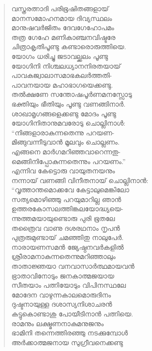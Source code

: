 \begin{verse}
വസ്ത്രരത്നാദി പരിഭൂഷിതങ്ങളായ്\\
മാനസമോഹനമായ ദിവ്യസ്ഥലം\\
മാനുഷവര്‍ജിതം ദേവഗേഹോപമം\\
തത്ര ഗേഹേ മണികാഞ്ചനവിഷ്ടരേ\\
ചിത്രാകൃതിപൂണ്ടു കണ്ടാരൊരുത്തിയെ.\\
യോഗം ധരിച്ചു ജടാവല്ക്കലം പൂണ്ടു\\
യോഗിനി നിശ്ചലധ്യാനനിരതയായ്\\
പാവകജ്വാലാസമാഭകലര്‍ത്തതി-\\
പാവനയായ മഹാഭാഗയെക്കണ്ടു.\\
തല്‍ക്ഷണേ സന്തോഷപൂര്‍ണമനസ്സോടു\\
ഭക്തിയും ഭീതിയും പൂണ്ടു വണങ്ങിനാര്‍.\\
ശാഖാമൃഗങ്ങളെക്കണ്ടു മോദം പൂണ്ടു\\
യോഗിനിതാനുമവരോടു ചൊല്ലിനാള്‍:\\
“നിങ്ങളാരാകുന്നതെന്നു പറയണ-\\
മിങ്ങുവന്നീടുവാന്‍ മൂലവും ചൊല്ലണം.\\
എങ്ങനെ മാര്‍ഗമറിഞ്ഞവാറെന്നതു-\\
മെങ്ങിനിപ്പോകുന്നതെന്നും പറയണം.”\\
എന്നിവ കേട്ടൊരു വായുതനയനും\\
നന്നായ് വണങ്ങി വിനീതനായ് ചൊല്ലിനാന്‍:\\
“വൃത്താന്തമൊക്കവേ കേട്ടാലുമെങ്കിലോ\\
സത്യമൊഴിഞ്ഞു പറയുമാറില്ല ഞാന്‍\\
ഉത്തരകോസലത്തിങ്കലയോദ്ധ്യയെ-\\
ന്നുത്തമയായുണ്ടൊരു പുരി ഭൂതലേ\\
തത്രൈവ വാണു ദശരഥനാം നൃപന്‍\\
പുത്രരുമുണ്ടായ് ചമഞ്ഞിതു നാലുപേര്‍.\\
നാരായണസമന്‍ ജ്യേഷ്ഠനവര്‍കളില്‍\\
ശ്രീരാമനാകുന്നതെന്നുമറിഞ്ഞാലും\\
താതാജ്ഞയാ വനവാസാര്‍ത്ഥമായവന്‍\\
ഭ്രാതാവിനോടും ജനകാത്മജയായ\\
സീതയാം പത്നിയോടും വിപിനസ്ഥലേ\\
മോദേന വാഴുന്നകാലമൊരുദിനം\\
ദുഷ്ടനായുള്ള ദശാസ്യനിശാചരന്‍\\
കട്ടുകൊണ്ടാശു പോയീടിനാന്‍ പത്നിയെ.\\
രാമനും ലക്ഷ്മണനാകുമനുജനും\\
ഭാമിനി തന്നെത്തിരഞ്ഞു നടക്കുമ്പോള്‍\\
അര്‍ക്കാത്മജനായ സുഗ്രീവനെക്കണ്ടു\\

\end{verse}
